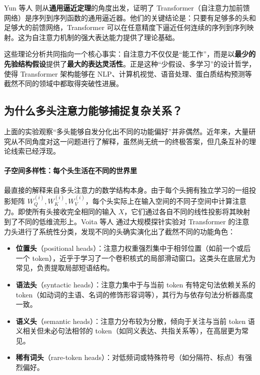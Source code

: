 Yun 等人\cite{yun2020transformersuniversalapproximatorssequencetosequence} 则从\textbf{通用逼近定理}的角度出发，证明了 Transformer（自注意力加前馈网络）是序列到序列函数的通用逼近器。他们的关键结论是：只要有足够多的头和足够大的前馈网络，Transformer 可以在任意精度下逼近任何连续的序列到序列映射。这为自注意力机制的强大表达能力提供了理论基础。

这些理论分析共同指向一个核心事实：自注意力不仅仅是“能工作”，而是以\textbf{最少的先验结构假设}提供了\textbf{最大的表达灵活性}。正是这种“少假设、多学习”的设计哲学，使得 Transformer 架构能够在 NLP、计算机视觉、语音处理、蛋白质结构预测等截然不同的领域中都取得突破性进展\cite{bommasani2022opportunitiesrisksfoundationmodels}。

\subsection{为什么多头注意力能够捕捉复杂关系？}

上面的实验观察“多头能够自发分化出不同的功能偏好”并非偶然。近年来，大量研究从不同角度对这一问题进行了解释，虽然尚无统一的终极答案，但几条互补的理论线索已经浮现。

\paragraph{子空间多样性：每个头生活在不同的世界里}

最直接的解释来自多头注意力的数学结构本身。由于每个头拥有独立学习的一组投影矩阵 $W_Q^{(i)}, W_K^{(i)}, W_V^{(i)}$，每个头实际上在输入空间的不同子空间中计算注意力。即使所有头接收完全相同的输入 $X$，它们通过各自不同的线性投影将其映射到了不同的低维流形上。Voita 等人\cite{voita2019analyzingmultiheadselfattentionspecialized} 通过大规模探针实验对 Transformer 的注意力头进行了系统性分类，发现不同的头确实演化出了截然不同的功能角色：

\begin{itemize}
    \item \textbf{位置头}（positional heads）：注意力权重强烈集中于相邻位置（如前一个或后一个 token），近乎于学习了一个卷积核式的局部滑动窗口。这类头在底层尤为常见，负责提取局部短语结构。
    \item \textbf{语法头}（syntactic heads）：注意力集中于与当前 token 有特定句法依赖关系的 token（如动词的主语、名词的修饰形容词等），其行为与依存句法分析器高度一致。
    \item \textbf{语义头}（semantic heads）：注意力分布较为分散，倾向于关注与当前 token 语义相关但未必句法相邻的 token（如同义表达、共指关系等），在高层更为常见。
    \item \textbf{稀有词头}（rare-token heads）：对低频词或特殊符号（如分隔符、标点）有强烈偏好。
\end{itemize}


